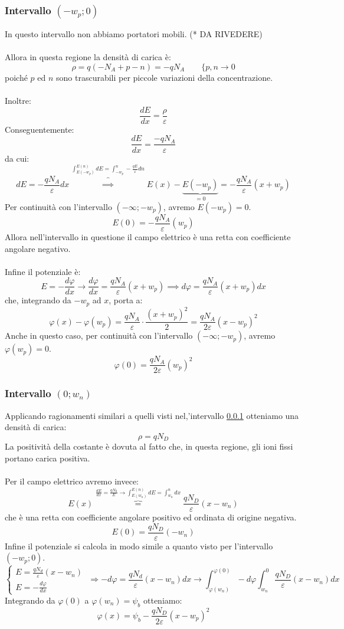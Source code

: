 \documentclass{article}
\numberwithin{equation}{subsection}
\begin{document}
	\subsubsection{Intervallo $(-w_p; 0)$}
	\label{subsub:int-pn3}
	In questo intervallo non abbiamo portatori mobili. ({\color{red}* DA RIVEDERE})\\\\
	Allora in questa regione la densità di carica è:
	$$\rho = q(-N_A + p - n) = -qN_A \qquad \{ p,n \to 0$$
	poiché $p$ ed $n$ sono trascurabili per piccole variazioni della concentrazione.\\\\
	Inoltre:
	$$\frac{dE}{dx} = \frac{\rho}{\varepsilon}$$
	Conseguentemente:
	$$\frac{dE}{dx} = \frac{-qN_A}{\varepsilon}$$
	da cui:
	$$dE = -\frac{qN_A}{\varepsilon}dx \overbrace{\implies}^{\int_{E(-w_p)}^{E(n)} dE = \int_{-w_p}^{n} - \frac{qE}{\varepsilon} dn} E(x) - \underbrace{E(-w_p)}_{=0} = -\frac{qN_A}{\varepsilon}(x + w_p)$$
	Per continuità con l’intervallo $(-\infty; -w_p)$, avremo $E(-w_p) = 0$.
	$$E(0) = -\frac{qN_A}{\varepsilon}(w_p)$$
	Allora nell’intervallo in questione il campo elettrico è una retta con coefficiente angolare negativo.\\\\
	Infine il potenziale è:
	$$E = - \frac{d \varphi}{dx} \rightarrow \frac{d\varphi}{dx} = \frac{qN_A}{\varepsilon}(x + w_p) \implies d\varphi = \frac{qN_A}{\varepsilon}(x + w_p)dx$$
	che, integrando da $-w_p$ ad $x$, porta a:
	$$\varphi(x) - \varphi(w_p) = \frac{qN_A}{\varepsilon} \cdot \frac{(x + w_p)^2}{2} = \frac{qN_A}{2\varepsilon}(x - w_p)^2$$
	Anche in questo caso, per continuità con l’intervallo $(-\infty; -w_p)$, avremo $\varphi(w_p) = 0$.
	$$\varphi(0) = \frac{qN_A}{2\varepsilon}(w_p)^2$$
	\subsubsection{Intervallo $(0; w_n)$}
	\label{subsub:int-pn4}
	Applicando ragionamenti similari a quelli visti nel,'intervallo \ref{subsub:int-pn3} otteniamo una densità di carica:
	$$\rho = qN_D$$
	La positività della costante è dovuta al fatto che, in questa regione, gli ioni fissi portano carica positiva.\\\\
	Per il campo elettrico avremo invece:
	$$E\left(x\right)\overbrace{=}^{\frac{dE}{dx}=\frac{qN_{0}}{E}\rightarrow\int_{E(w_n)}^{E(n)} dE=\int_{w_n}^{n}dx}\frac{qN_D}{\varepsilon}\left(x-w_n\right)$$
	che è una retta con coefficiente angolare positivo ed ordinata di origine negativa.
	$$E\left(0\right)=\frac{qN_D}{\varepsilon}\left(-w_n\right)$$
	Infine il potenziale si calcola in modo simile a quanto visto per l’intervallo $(-w_p; 0)$.
	$$\begin{cases} E=\frac{qN_d}{\varepsilon}\left(x-w_n\right) \\ E=-\frac{d\varphi}{dx}\end{cases}
	\;
	\Rightarrow-d\varphi=\frac{qN_d}{\varepsilon}\left(x-w_n\right)dx
	\rightarrow \int_{\varphi(w_{n})}^{\varphi(0)} -d\varphi \int_{w_{n}}^{0}\frac{q N_D}{\varepsilon}\left(x-w_{n}\right)dx$$
	Integrando da $\varphi\left(0\right)$ a $\varphi\left(w_n\right)=\psi_b$ otteniamo:
	$$\varphi\left(x\right)=\psi_b-\frac{qN_D}{2\varepsilon}\left(x-w_p\right)^2$$
\end{document}
